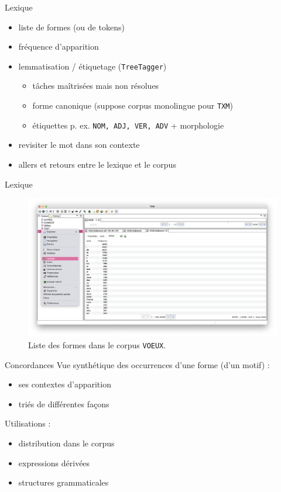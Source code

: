 \documentclass[xetex,xcolor={table,usenames,dvipsnames}]{beamer}
\begin{document}
\begin{frame}{Lexique}
	\begin{itemize}
		\item liste de formes (ou de tokens)
		\item fréquence d'apparition
		\item lemmatisation / étiquetage (\texttt{TreeTagger})
		\begin{itemize}
			\item \textcolor{deepred}{tâches maîtrisées mais non résolues}
			\item forme canonique (suppose corpus monolingue pour \texttt{TXM})
			\item étiquettes p. ex. \texttt{NOM, ADJ, VER, ADV} + morphologie
		\end{itemize}
		\item revisiter le mot dans son contexte
		\item allers et retours entre le lexique et le corpus
	\end{itemize}
\end{frame}

\begin{frame}{Lexique}
		\begin{figure}[h] %
		\centering
		\includegraphics[width=1\linewidth]{img/lexique.png}
		\caption{Liste des formes dans le corpus \texttt{VOEUX}.}
		\label{fig:ling_out_TAL}
	\end{figure}
\end{frame}
\begin{frame}{Concordances}
	Vue synthétique des occurrences d'une forme (d'un motif) :
	\begin{itemize}
		\item ses contextes d'apparition
		\item triés de différentes façons
	\end{itemize}
	
	Utilisations :
	\begin{itemize}
		\item distribution dans le corpus
		\item expressions dérivées
		\item structures grammaticales
	\end{itemize}
	
	
\end{frame}
\end{document}
